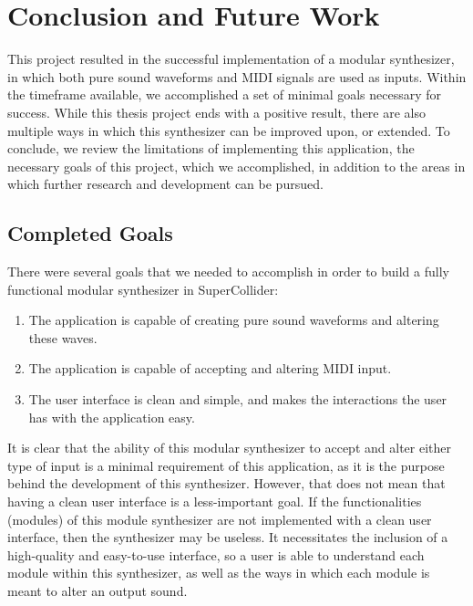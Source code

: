\chapter{Conclusion and Future Work}\label{conclusion}

This project resulted in the successful implementation of a modular synthesizer, in which both pure sound waveforms and MIDI signals are used as inputs. Within the timeframe available, we accomplished a set of minimal goals necessary for success. While this thesis project ends with a positive result, there are also multiple ways in which this synthesizer can be improved upon, or extended. To conclude, we review the limitations of implementing this application, the necessary goals of this project, which we accomplished, in addition to the areas in which further research and development can be pursued. 



\section{Completed Goals}

There were several goals that we needed to accomplish in order to build a fully functional modular synthesizer in SuperCollider:

\begin{enumerate}
	\item The application is capable of creating pure sound waveforms and altering these waves.
	\item The application is capable of accepting and altering MIDI input.
	\item The user interface is clean and simple, and makes the interactions the user has with the application easy.
\end{enumerate}

It is clear that the ability of this modular synthesizer to accept and alter either type of input is a minimal requirement of this application, as it is the purpose behind the development of this synthesizer. However, that does not mean that having a clean user interface is a less-important goal. If the functionalities (modules) of this module synthesizer are not implemented with a clean user interface, then the synthesizer may be useless. It necessitates the inclusion of a high-quality and easy-to-use interface, so a user is able to understand each module within this synthesizer, as well as the ways in which each module is meant to alter an output sound. 

